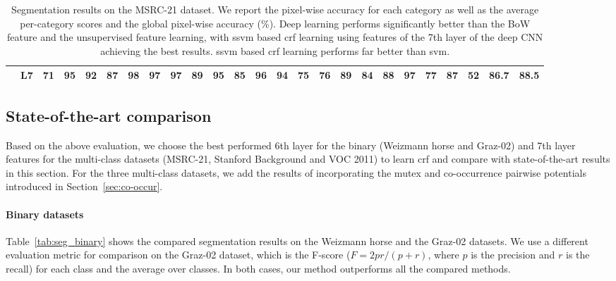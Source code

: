 \documentclass[10pt,3p]{elsarticle}
\newcommand{\ssvm}{{\sc ssvm}\xspace}
\newcommand{\svm}{{\sc svm}\xspace}
\newcommand{\crf}{{\sc crf}\xspace}
\begin{document}
\begin{table}[!t]
{\begin{tabular}{ c c| c c c c c c c c c c c c c c c c c c c c c |c c }
&L7   &71    &95    &92    &87    &98    &97    &97    &89    &95    &85    &96    &94    &75    &76    &89    &84    &88    &97    &77    &87    &52   &\textbf{86.7} &\textbf{88.5} \\
\hline
\end{tabular}
}
\caption{Segmentation results on the MSRC-21 dataset.
We report the pixel-wise accuracy for each category as well as the average per-category scores and the global pixel-wise accuracy (\%). 
Deep learning performs significantly better than the BoW feature and the unsupervised feature learning, with \ssvm based \crf learning using features of the 7th layer of the deep CNN achieving the best results. 
\ssvm based \crf learning performs far better than \svm.
}
\label{tab:seg_msrc_baseline}
\end{table}\subsection{State-of-the-art comparison}\label{sec:exp2}
Based on the above evaluation, we choose the best performed 6th layer for the binary (Weizmann horse and Graz-02) and 7th layer features for the multi-class datasets (MSRC-21, Stanford Background and VOC 2011)  to learn \crf and compare with state-of-the-art results in this section. 
For the three multi-class datasets, we add the results of incorporating the mutex and co-occurrence pairwise potentials introduced in Section~\ref{sec:co-occur}.

\paragraph{Binary datasets}
Table~\ref{tab:seg_binary} shows the compared segmentation results on the Weizmann horse and the Graz-02 datasets. We use a different evaluation metric for comparison on the Graz-02 dataset, which is the F-score ($F=2pr/(p+r)$, where $p$ is the precision and $r$ is the recall) for each class and the average over classes. In both cases, our method outperforms all the compared methods. 
\end{document}

